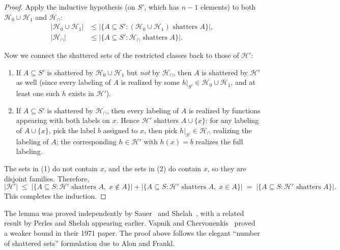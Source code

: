 \begin{proof}
Apply the inductive hypothesis (on $S'$, which has $n-1$ elements) to both
$\mathcal{H}_0 \cup \mathcal{H}_1$ and $\mathcal{H}_\cap$:
\begin{align*}
  |\mathcal{H}_0 \cup \mathcal{H}_1|
    &\leq \bigl|\{A \subseteq S' : (\mathcal{H}_0 \cup \mathcal{H}_1) \text{ shatters } A\}\bigr|, \\
  |\mathcal{H}_\cap|
    &\leq \bigl|\{A \subseteq S' : \mathcal{H}_\cap \text{ shatters } A\}\bigr|.
\end{align*}

Now we connect the shattered sets of the restricted classes back to those
of $\mathcal{H}'$:

\begin{enumerate}[leftmargin=*,itemsep=3pt]
\item If $A \subseteq S'$ is shattered by $\mathcal{H}_0 \cup \mathcal{H}_1$
  but \emph{not} by $\mathcal{H}_\cap$, then $A$ is shattered by $\mathcal{H}'$
  as well (since every labeling of $A$ is realized by some $h|_{S'} \in
  \mathcal{H}_0 \cup \mathcal{H}_1$, and at least one such $h$ exists in
  $\mathcal{H}'$).

\item If $A \subseteq S'$ is shattered by $\mathcal{H}_\cap$, then every
  labeling of $A$ is realized by functions appearing with both labels on $x$.
  Hence $\mathcal{H}'$ shatters $A \cup \{x\}$: for any labeling of
  $A \cup \{x\}$, pick the label $b$ assigned to $x$, then pick $h|_{S'} \in
  \mathcal{H}_\cap$ realizing the labeling of $A$; the corresponding
  $h \in \mathcal{H}'$ with $h(x) = b$ realizes the full labeling.
\end{enumerate}

The sets in (1) do not contain $x$, and the sets in (2) do
contain $x$, so they are disjoint families.  Therefore,
\[
  |\mathcal{H}'|
  \;\leq\; \bigl|\{A \subseteq S : \mathcal{H}' \text{ shatters } A,\;
  x \notin A\}\bigr|
  + \bigl|\{A \subseteq S : \mathcal{H}' \text{ shatters } A,\;
  x \in A\}\bigr|
  \;=\; \bigl|\{A \subseteq S : \mathcal{H}' \text{ shatters } A\}\bigr|.
\]
This completes the induction.
\end{proof}

\begin{remark}
The lemma was proved independently by Sauer~\cite{Sauer1972} and
Shelah~\cite{Shelah1972}, with a related result by Perles and Shelah
appearing earlier.  Vapnik and Chervonenkis~\cite{VapnikChervonenkis1971}
proved a weaker bound in their 1971 paper.  The proof above follows the
elegant ``number of shattered sets'' formulation due to Alon and
Frankl.
\end{remark}


